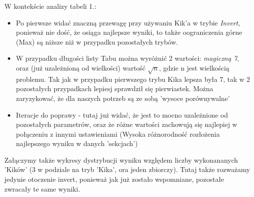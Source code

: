 \documentclass{article}
\begin{document}
W kontekście analizy tabeli 1.:
\begin{itemize}
	\item Po pierwsze widać znaczną przewagę przy używaniu Kik'a w trybie \textit{Invert}, ponieważ nie dość, że osiąga najlepsze wyniki, to także oograniczenia górne (Max) są niższe niż w przypadku pozostałych trybów.
	\item W przypadku długości listy Tabu można wyróżnić 2 wartości: \textit{magiczną 7}, oraz (już uzależnioną od wielkości) wartość $\sqrt{n}$, gdzie n jest wielkością problemu. Tak jak w przypadku pierwszego trybu Kika lepsza była 7, tak w 2 pozostałych przypadkach lepiesj sprawdził się pierwiastek. Można zaryzykować, że dla naszych potrzeb są ze sobą 'wysoce porównywalne'
	\item Iteracje do poprawy - tutaj już widać, że jest to mocno uzależnione od pozostałych parametrów, oraz że różne wartości zachowują się najlepiej w połączeniu z innymi ustawieniami (Wysoka różnorodność rozłożenia najlepszego wyniku w danych 'sekcjach')
\end{itemize}

Załączymy także wykresy dystrybucji wyniku względem liczby wykonananych 'Kików' (3 w podziale na tryb 'Kika', ora jeden zbiorczy). Tutaj także rozważamy jedynie otoczenie invert, ponieważ jak już zostało wspomniane, pozostałe zwracały te same wyniki.
\end{document}
